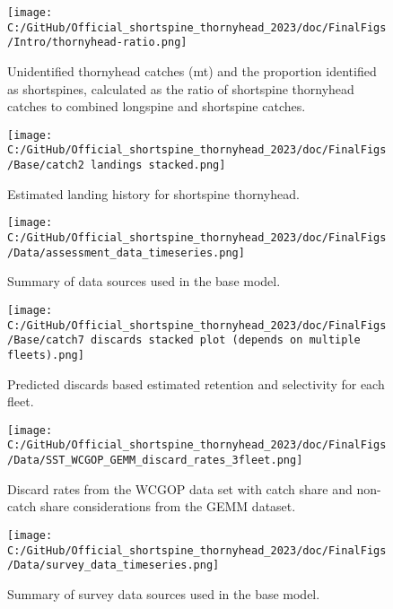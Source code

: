 \documentclass[11pt,
  english,
  letterpaper,
]{article}
\begin{document}
\begin{figure}
\centering
\texttt{[image: C:/GitHub/Official\_shortspine\_thornyhead\_2023/doc/FinalFigs/Intro/thornyhead-ratio.png]}
\caption{Unidentified thornyhead catches (mt) and the proportion identified as shortspines, calculated as the ratio of shortspine thornyhead catches to combined longspine and shortspine catches.\label{fig:thornyhead-ratio}}
\end{figure}

\begin{figure}
\centering
\texttt{[image: C:/GitHub/Official\_shortspine\_thornyhead\_2023/doc/FinalFigs/Base/catch2 landings stacked.png]}
\caption{Estimated landing history for shortspine thornyhead.\label{fig:catch_hist}}
\end{figure}

\begin{figure}
\centering
\texttt{[image: C:/GitHub/Official\_shortspine\_thornyhead\_2023/doc/FinalFigs/Data/assessment\_data\_timeseries.png]}
\caption{Summary of data sources used in the base model.\label{fig:assessment_data_timeseries}}
\end{figure}

\begin{figure}
\centering
\texttt{[image: C:/GitHub/Official\_shortspine\_thornyhead\_2023/doc/FinalFigs/Base/catch7 discards stacked plot (depends on multiple fleets).png]}
\caption{Predicted discards based estimated retention and selectivity for each fleet.\label{fig:disc_hist}}
\end{figure}

\begin{figure}
\centering
\texttt{[image: C:/GitHub/Official\_shortspine\_thornyhead\_2023/doc/FinalFigs/Data/SST\_WCGOP\_GEMM\_discard\_rates\_3fleet.png]}
\caption{Discard rates from the WCGOP data set with catch share and non-catch share considerations from the GEMM dataset.\label{fig:disc_rates_WCGOP}}
\end{figure}

\begin{figure}
\centering
\texttt{[image: C:/GitHub/Official\_shortspine\_thornyhead\_2023/doc/FinalFigs/Data/survey\_data\_timeseries.png]}
\caption{Summary of survey data sources used in the base model.\label{fig:survey_data_timeseries}}
\end{figure}
\end{document}
